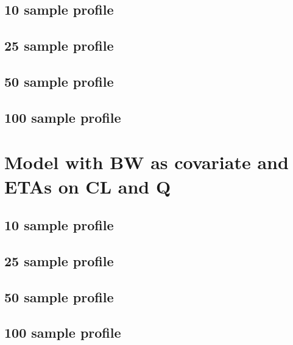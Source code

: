 \subsection{10 sample profile}


\subsection{25 sample profile}


\subsection{50 sample profile}


\subsection{100 sample profile}



\section{Model with BW as covariate and ETAs on CL and Q}
\subsection{10 sample profile}


\subsection{25 sample profile}


\subsection{50 sample profile}


\subsection{100 sample profile}



